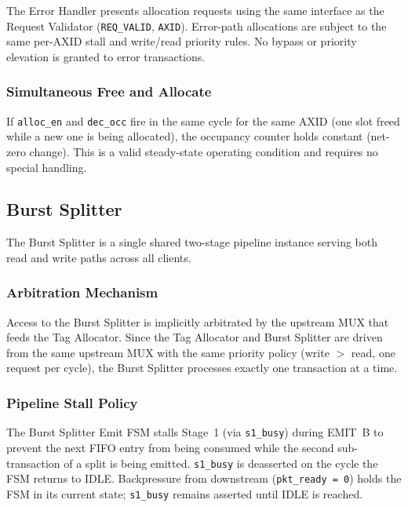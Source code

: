 \documentclass[11pt,a4paper]{article}
\begin{document}
The Error Handler presents allocation requests using the same interface as the
Request Validator (\texttt{REQ\_VALID}, \texttt{AXID}). Error-path allocations
are subject to the same per-AXID stall and write/read priority rules. No
bypass or priority elevation is granted to error transactions.

\subsubsection*{Simultaneous Free and Allocate}

If \texttt{alloc\_en} and \texttt{dec\_occ} fire in the same cycle for the
same AXID (one slot freed while a new one is being allocated), the occupancy
counter holds constant (net-zero change). This is a valid steady-state
operating condition and requires no special handling.

\subsection{Burst Splitter}

The Burst Splitter is a single shared two-stage pipeline instance serving both
read and write paths across all clients.

\subsubsection*{Arbitration Mechanism}

Access to the Burst Splitter is implicitly arbitrated by the upstream MUX that
feeds the Tag Allocator. Since the Tag Allocator and Burst Splitter are driven
from the same upstream MUX with the same priority policy (write $>$ read,
one request per cycle), the Burst Splitter processes exactly one transaction
at a time.

\subsubsection*{Pipeline Stall Policy}

The Burst Splitter Emit FSM stalls Stage~1 (via \texttt{s1\_busy}) during
\textsc{EMIT~B} to prevent the next FIFO entry from being consumed while the
second sub-transaction of a split is being emitted. \texttt{s1\_busy} is
deasserted on the cycle the FSM returns to \textsc{IDLE}. Backpressure from
downstream (\texttt{pkt\_ready = 0}) holds the FSM in its current state;
\texttt{s1\_busy} remains asserted until \textsc{IDLE} is reached.
\end{document}
